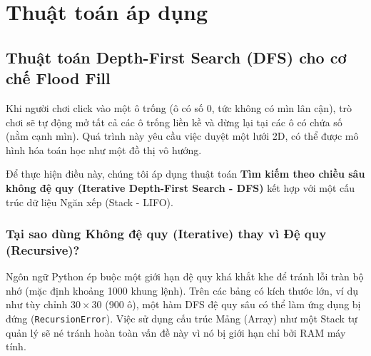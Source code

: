 \section{Thuật toán áp dụng}

\subsection{Thuật toán Depth-First Search (DFS) cho cơ chế Flood Fill}

Khi người chơi click vào một ô trống (ô có số 0, tức không có mìn lân cận), trò chơi sẽ tự động mở tất cả các ô trống liền kề và dừng lại tại các ô có chứa số (nằm cạnh mìn). Quá trình này yêu cầu việc duyệt một lưới 2D, có thể được mô hình hóa toán học như một đồ thị vô hướng.

Để thực hiện điều này, chúng tôi áp dụng thuật toán \textbf{Tìm kiếm theo chiều sâu không đệ quy (Iterative Depth-First Search - DFS)} kết hợp với một cấu trúc dữ liệu Ngăn xếp (Stack - LIFO).

\subsubsection{Tại sao dùng Không đệ quy (Iterative) thay vì Đệ quy (Recursive)?}
Ngôn ngữ Python ép buộc một giới hạn đệ quy khá khắt khe để tránh lỗi tràn bộ nhớ (mặc định khoảng 1000 khung lệnh). Trên các bảng có kích thước lớn, ví dụ như tùy chỉnh $30\times30$ (900 ô), một hàm DFS đệ quy sâu có thể làm ứng dụng bị đứng (\texttt{RecursionError}). Việc sử dụng cấu trúc Mảng (Array) như một Stack tự quản lý sẽ né tránh hoàn toàn vấn đề này vì nó bị giới hạn chỉ bởi RAM máy tính.

